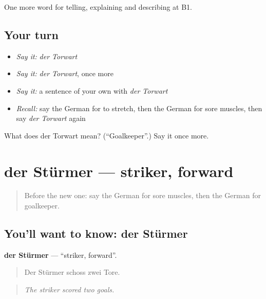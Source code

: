 \begin{grammarlens}[title={What you've built}]
One more word for telling, explaining and describing at B1.
\end{grammarlens}

\subsection*{Your turn}
\begin{itemize}
\raggedright
  \item \emph{Say it:} \emph{der Torwart}
  \item \emph{Say it:} \emph{der Torwart}, once more
  \item \emph{Say it:} a sentence of your own with \emph{der Torwart}
  \item \emph{Recall:} say the German for to stretch, then the German for sore muscles, then say \emph{der Torwart} again
\end{itemize}

\begin{tcolorbox}[breakable,colback=teal!4,colframe=teal!35!black,title={Before you move on}]
What does der Torwart mean? (\textquotedblleft{}Goalkeeper\textquotedblright{}.) Say it once more.
\end{tcolorbox}
\section[der Stürmer]{der Stürmer — striker, forward}

\label{lesson:GE-C506-stuermer}



\begin{quote}
Before the new one: say the German for sore muscles, then the German for goalkeeper.
\end{quote}

\subsection*{You'll want to know: der Stürmer}
\textbf{der Stürmer} — \textquotedblleft{}striker, forward\textquotedblright{}.

\begin{quote}
Der Stürmer schoss zwei Tore.
\end{quote}

\begin{quote}
\emph{The striker scored two goals.}
\end{quote}

